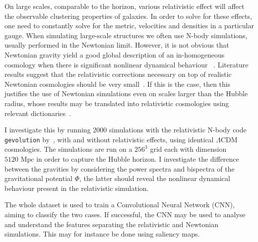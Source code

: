 On large scales, comparable to the horizon, various relativistic effect will affect the observable clustering properties of galaxies. In order to solve for these effects, one need to constantly solve for the metric, velocities and densities in a particular gauge. When simulating large-scale structures we often use N-body simulations, usually performed in the Newtonian limit. However, it is not obvious that Newtonian gravity yield a good global description of an in-homogeneous cosmology when there is significant nonlinear dynamical behaviour ~\parencite{jeong_large-scale_2012}. Literature results suggest that the relativistic corrections necessary on top of realistic Newtonian cosmologies should be very small~\parencite{chisari_connection_2011}. If this is the case, then this justifies the use of Newtonian simulations even on scales larger than the Hubble radius, whose results may be translated into relativistic cosmologies using relevant dictionaries~\parencite{green_newtonian_2012}.

I investigate this by running 2000 simulations with the relativistic N-body code \texttt{gevolution} by~\cite{adamek_gevolution_2016}, with and without relativistic effects, using identical $\Lambda$CDM cosmologies. The simulations are run on a $256^3$ grid each with dimension $5120\text{ Mpc}$ in order to capture the Hubble horizon. I investigate the difference between the gravities by considering the power spectra and bispectra of the gravitational potential $\Phi$, the latter should reveal the nonlinear dynamical behaviour present in the relativistic simulation. 

The whole dataset is used to train a Convolutional Neural Network (CNN), aiming to classify the two cases. If successful, the CNN may be used to analyse and understand the features separating the relativistic and Newtonian simulations. This may for instance be done using saliency maps. 
